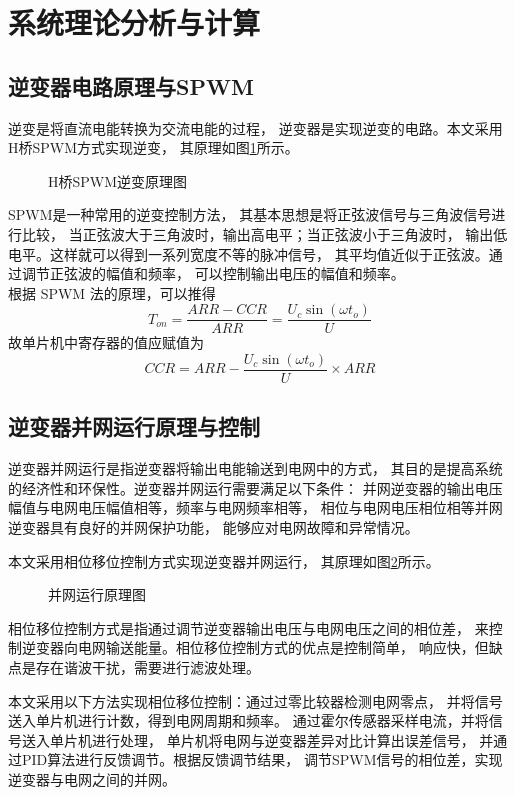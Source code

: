 \documentclass[a4paper,12pt]{article}
\begin{document}
\newpage

\section{系统理论分析与计算}
\subsection{逆变器电路原理与SPWM}
逆变是将直流电能转换为交流电能的过程，
逆变器是实现逆变的电路。本文采用H桥SPWM方式实现逆变，
其原理如图\ref{fig3}所示。
\begin{figure}[htbp]
\centering
\caption{H桥SPWM逆变原理图}
\label{fig3}
\end{figure}

SPWM是一种常用的逆变控制方法，
其基本思想是将正弦波信号与三角波信号进行比较，
当正弦波大于三角波时，输出高电平；当正弦波小于三角波时，
输出低电平。这样就可以得到一系列宽度不等的脉冲信号，
其平均值近似于正弦波。通过调节正弦波的幅值和频率，
可以控制输出电压的幅值和频率。
\\
根据 SPWM 法的原理，可以推得
\begin{equation*}
T_{on}=\frac{ARR-CCR}{ARR}=\frac{U_c\sin(\omega t_o)}{U}
\end{equation*}
故单片机中寄存器的值应赋值为
\begin{equation*}
CCR=ARR-\frac{U_c\sin (\omega t_o)}{U}\times ARR
\end{equation*}

\subsection{逆变器并网运行原理与控制}
逆变器并网运行是指逆变器将输出电能输送到电网中的方式，
其目的是提高系统的经济性和环保性。逆变器并网运行需要满足以下条件：
并网逆变器的输出电压幅值与电网电压幅值相等，频率与电网频率相等，
相位与电网电压相位相等并网逆变器具有良好的并网保护功能，
能够应对电网故障和异常情况。


本文采用相位移位控制方式实现逆变器并网运行，
其原理如图\ref{fig4}所示。
\begin{figure}
\centering
\caption{并网运行原理图}
\label{fig4}
\end{figure}


相位移位控制方式是指通过调节逆变器输出电压与电网电压之间的相位差，
来控制逆变器向电网输送能量。相位移位控制方式的优点是控制简单，
响应快，但缺点是存在谐波干扰，需要进行滤波处理。


本文采用以下方法实现相位移位控制：通过过零比较器检测电网零点，
并将信号送入单片机进行计数，得到电网周期和频率。
通过霍尔传感器采样电流，并将信号送入单片机进行处理，
单片机将电网与逆变器差异对比计算出误差信号，
并通过PID算法进行反馈调节。根据反馈调节结果，
调节SPWM信号的相位差，实现逆变器与电网之间的并网。
\end{document}
